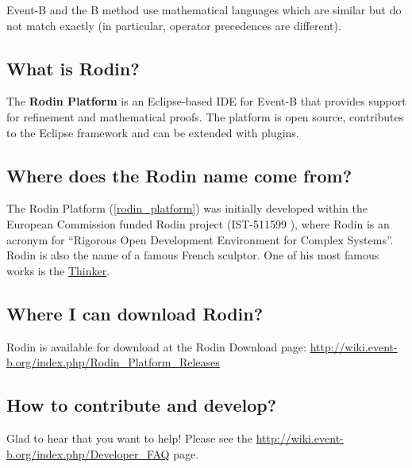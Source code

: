Event-B and the B method use mathematical languages which are similar but do not match exactly (in particular, operator precedences are different).

\subsection{What is Rodin?}

The \textbf{Rodin Platform} is an Eclipse-based IDE for Event-B that provides support for refinement and mathematical proofs. The platform is open source, contributes to the Eclipse framework and can be extended with plugins.

\subsection{Where does the Rodin name come from?}

The Rodin Platform (\ref{rodin_platform}) was initially developed within the European Commission funded Rodin project (IST-511599 ), where Rodin is an acronym for ``Rigorous Open Development Environment for Complex Systems''. Rodin is also the name of a famous French sculptor. One of his most famous works is the \href{http://en.wikipedia.org/wiki/The_Thinker}{Thinker}. 

\subsection{Where I can download Rodin?}
\label{faq_where_download_rodin}

Rodin is available for download at the Rodin Download page: \url{http://wiki.event-b.org/index.php/Rodin_Platform_Releases}

\subsection{How to contribute and develop?}

Glad to hear that you want to help!  Please see the \url{http://wiki.event-b.org/index.php/Developer_FAQ} page.

